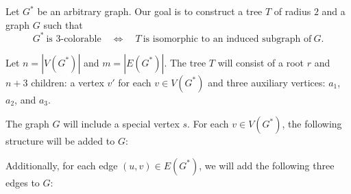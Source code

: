 \documentclass[12pt]{article}
\begin{document}
	\medskip
	
	Let \(G^{\ast}\) be an arbitrary graph. Our goal is to construct a tree
	\(T\) of radius \(2\) and a graph \(G\) such that
	\begin{equation} \label{eq:eq2}
		G^{\ast} \ \text{is 3-colorable} \quad \iff \quad T \ \text{is
		isomorphic to an induced subgraph of} \ G \text{.}
	\end{equation}
	
	\medskip
	
	Let \(n = |V(G^{\ast})|\) and \(m = |E(G^{\ast})|\). The tree \(T\) will
	consist of a root \(r\) and \(n + 3\) children: a vertex \(v'\) for each \(v
	\in V(G^{\ast})\) and three auxiliary vertices: \(a_{1}\), \(a_{2}\), and
	\(a_{3}\).
	
	\newpage
	
	The graph \(G\) will include a special vertex \(s\). For each \(v
	\in V(G^{\ast})\), the following structure will be added to \(G\):
	\begin{center}
	\end{center}
	Additionally, for each edge \((u, v) \in E(G^{\ast})\), we will add the
	following three edges to \(G\):
\end{document}
